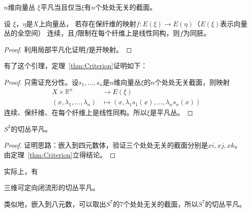     \begin{theorem}\label{thm:Criterion}
        $n$维向量丛 $\xi$平凡当且仅当$\xi$有$n$个处处无关的截面。
    \end{theorem}

    \begin{lemma}
        设 $\xi$，$\eta$是$X$上向量丛，
        若存在保纤维的映射$f:E(\xi)\rightarrow E(\eta)$（$E(\xi)$表示向量丛的全空间）
        连续，且$f$限制在每个纤维上是线性同构，则$f$为同胚。
    \end{lemma}
    \begin{proof}
        利用局部平凡化证明$f$是开映射。
    \end{proof}

    \qquad 有了这个引理，定理~\ref{thm:Criterion}证明如下：
    \begin{proof}
        只需证充分性。设$s_1,\ldots,s_n$是$n$维向量丛$\xi$的$n$个处处无关截面，则映射
        $$
            \begin{aligned}
                X\times \mathbb{R}^n & \rightarrow E(\xi) \\
                (x,\lambda_1,\ldots,\lambda_n) & \mapsto (x,\lambda_1 s_1(x),\ldots, \lambda_n s_n(x))
            \end{aligned}
        $$
        连续、保纤维、在每个纤维上是线性同构。所以$\xi$是平凡丛。
    \end{proof}

    \begin{example}
        $S^3$的切丛平凡。
    \end{example}
    \begin{proof}
        证明思路：嵌入到四元数体，验证三个处处无关的截面分别是$xi,xj,xk$。
        由定理~\ref{thm:Criterion}立得结论。
    \end{proof}

    \qquad 实际上，有
    \begin{theorem}
        三维可定向闭流形的切丛平凡。
    \end{theorem}

    \begin{example}
        类似地，嵌入到八元数，可以取出$S^7$的$7$个处处无关的截面，所以$S^7$的切丛平凡。
    \end{example}

